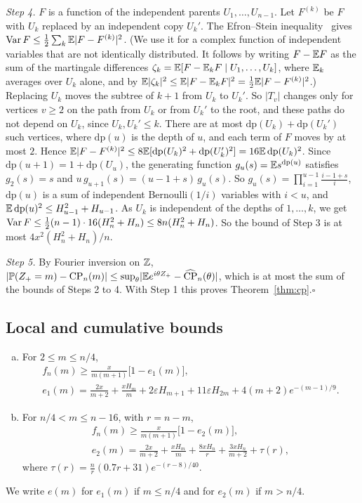 \emph{Step 4.} $F$ is a function of the independent parents
$U_1,\dots,U_{n-1}$. Let $F^{(k)}$ be $F$ with $U_k$ replaced by an
independent copy $U_k'$. The Efron--Stein inequality~\cite{efronstein1981}
gives $\operatorname{Var} F\le\frac12\sum_k\mathbb{E}\lvert F-F^{(k)}\rvert^2$. (We use it for a
complex function of independent variables that are not identically
distributed. It follows by writing $F-\mathbb{E} F$ as the sum of the martingale
differences $\zeta_k=\mathbb{E}[F-\mathbb{E}_kF\mid U_1,\dots,U_k]$, where $\mathbb{E}_k$ averages
over $U_k$ alone, and by
$\mathbb{E}\lvert\zeta_k\rvert^2\le\mathbb{E}\lvert F-\mathbb{E}_kF\rvert^2=\frac12\mathbb{E}\lvert F-F^{(k)}\rvert^2$.)
Replacing $U_k$ moves the subtree of $k+1$ from $U_k$ to $U_k'$. So
$\lvert T_v\rvert$ changes only for vertices $v\ge2$ on the path from $U_k$
or from $U_k'$ to the root, and these paths do not depend on $U_k$, since
$U_k,U_k'\le k$. There are at most $\mathrm{dp}(U_k)+\mathrm{dp}(U_k')$ such
vertices, where $\mathrm{dp}(u)$ is the depth of $u$, and each term of $F$
moves by at most $2$. Hence
$\mathbb{E}\lvert F-F^{(k)}\rvert^2\le8\mathbb{E}[\mathrm{dp}(U_k)^2+\mathrm{dp}(U_k')^2]=16\mathbb{E}\,\mathrm{dp}(U_k)^2$.
Since $\mathrm{dp}(u+1)=1+\mathrm{dp}(U_u)$, the generating function
$g_u(s)=\mathbb{E} s^{\mathrm{dp}(u)}$ satisfies $g_2(s)=s$ and
$u\,g_{u+1}(s)=(u-1+s)\,g_u(s)$. So $g_u(s)=\prod_{i=1}^{u-1}\frac{i-1+s}{i}$,
$\mathrm{dp}(u)$ is a sum of independent Bernoulli$(1/i)$ variables with
$i<u$, and $\mathbb{E}\,\mathrm{dp}(u)^2\le H_{u-1}^2+H_{u-1}$. As $U_k$ is independent
of the depths of $1,\dots,k$, we get
$\operatorname{Var} F\le\frac12(n-1)\cdot16(H_n^2+H_n)\le8n(H_n^2+H_n)$. So the bound of
Step 3 is at most $4x^2(H_n^2+H_n)/n$.

\emph{Step 5.} By Fourier inversion on $\mathbb{Z}$,
$\lvert\mathbb{P}(Z_+=m)-\mathrm{CP}_n(m)\rvert\le\sup_\theta\lvert\mathbb{E} e^{i\theta Z_+}-\widehat{\mathrm{CP}}_n(\theta)\rvert$,
which is at most the sum of the bounds of Steps 2 to 4. With Step 1 this
proves Theorem~\ref{thm:cp}.\hfill$\square$

\subsection{Local and cumulative bounds}\label{app:shape-local}

\begin{theorem}\label{thm:B-local-lower}
\begin{enumerate}[(a)]
\item For $2\le m\le n/4$,
\begin{gather*}
 f_n(m)\ge\frac{x}{m(m+1)}\bigl[1-e_1(m)\bigr],\\
 e_1(m)=\frac{2x}{m+2}+\frac{xH_m}m+2\varepsilon H_{m+1}+11\varepsilon H_{2m}+4(m+2)e^{-(m-1)/9}.
\end{gather*}
\item For $n/4<m\le n-16$, with $r=n-m$,
\begin{gather*}
 f_n(m)\ge\frac{x}{m(m+1)}\bigl[1-e_2(m)\bigr],\\
 e_2(m)=\frac{2x}{m+2}+\frac{xH_m}m+\frac{8xH_n}r+\frac{3xH_n}{m+2}+\tau(r),
\end{gather*}
where $\tau(r)=\frac nr(0.7r+31)e^{-(r-8)/40}$.
\end{enumerate}
We write $e(m)$ for $e_1(m)$ if $m\le n/4$ and for $e_2(m)$ if $m>n/4$.
\end{theorem}

